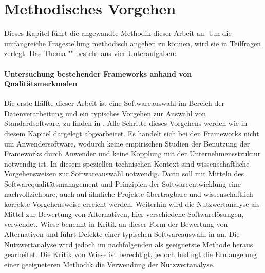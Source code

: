 \chapter{Methodisches Vorgehen}
\label{chapter:methodik}

Dieses Kapitel führt die angewandte Methodik dieser Arbeit an.
Um die umfangreiche Fragestellung methodisch angehen zu können, wird sie in Teilfragen zerlegt.
Das Thema "\titel{}" besteht aus vier Unteraufgaben:

\subsubsection{Untersuchung bestehender Frameworks anhand von Qualitätsmerkmalen}
Die erste Hälfte dieser Arbeit ist eine Softwareauswahl im Bereich der Datenverarbeitung und ein typisches Vorgehen zur Auswahl von Standardsoftware, zu finden in \cite[S.4]{book:softwareauswahl}.
Alle Schritte dieses Vorgehens werden wie in diesem Kapitel dargelegt abgearbeitet.
Es handelt sich bei den Frameworks nicht um Anwendersoftware, wodurch keine empirischen Studien der Benutzung der Frameworks durch Anwender und keine Kopplung mit der Unternehmensstruktur notwendig ist.
In diesem speziellen technischen Kontext sind wissenschaftliche Vorgehensweisen zur Softwareauswahl notwendig.
Darin soll mit Mitteln des Softwarequalitätsmanagement und Prinzipien der Softwareentwicklung eine nachvollziehbare, auch auf ähnliche Projekte übertragbare und wissenschaftlich korrekte Vorgehensweise erreicht werden.
Weiterhin wird die Nutzwertanalyse als Mittel zur Bewertung von Alternativen, hier verschiedene Softwarelösungen, verwendet.
Wiese benennt in \cite[S.5 ff.]{book:softwareauswahl} Kritik an dieser Form der Bewertung von Alternativen und führt Defekte einer typischen Softwareauswahl in \cite[S.12 ff.]{book:softwareauswahl} an.
Die Nutzwertanalyse wird jedoch im nachfolgenden als geeignetste Methode heraus gearbeitet.
Die Kritik von Wiese ist berechtigt, jedoch bedingt die Ermangelung einer geeigneteren Methodik die Verwendung der Nutzwertanalyse.

